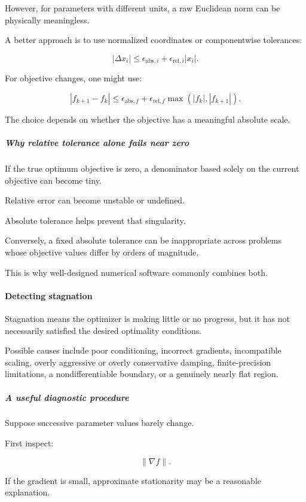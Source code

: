 However, for parameters with different units, a raw Euclidean norm can be physically meaningless.

A better approach is to use normalized coordinates or componentwise tolerances:

\[
|\Delta x_i| \le \epsilon_{\mathrm{abs},i} + \epsilon_{\mathrm{rel},i}|x_i|.
\]

For objective changes, one might use:

\[
|f_{k+1}-f_k| \le \epsilon_{\mathrm{abs},f} + \epsilon_{\mathrm{rel},f}\max(|f_k|,|f_{k+1}|).
\]

The choice depends on whether the objective has a meaningful absolute scale.

\subparagraph{Why relative tolerance alone fails near zero}\label{why-relative-tolerance-alone-fails-near-zero}

If the true optimum objective is zero, a denominator based solely on the current objective can become tiny.

Relative error can become unstable or undefined.

Absolute tolerance helps prevent that singularity.

Conversely, a fixed absolute tolerance can be inappropriate across problems whose objective values differ by orders of magnitude.

This is why well-designed numerical software commonly combines both.

\paragraph{Detecting stagnation}\label{detecting-stagnation}

Stagnation means the optimizer is making little or no progress, but it has not necessarily satisfied the desired optimality conditions.

Possible causes include poor conditioning, incorrect gradients, incompatible scaling, overly aggressive or overly conservative damping, finite-precision limitations, a nondifferentiable boundary, or a genuinely nearly flat region.

\subparagraph{A useful diagnostic procedure}\label{a-useful-diagnostic-procedure}

Suppose successive parameter values barely change.

First inspect:

\[
\|\nabla f\|.
\]

If the gradient is small, approximate stationarity may be a reasonable explanation.

